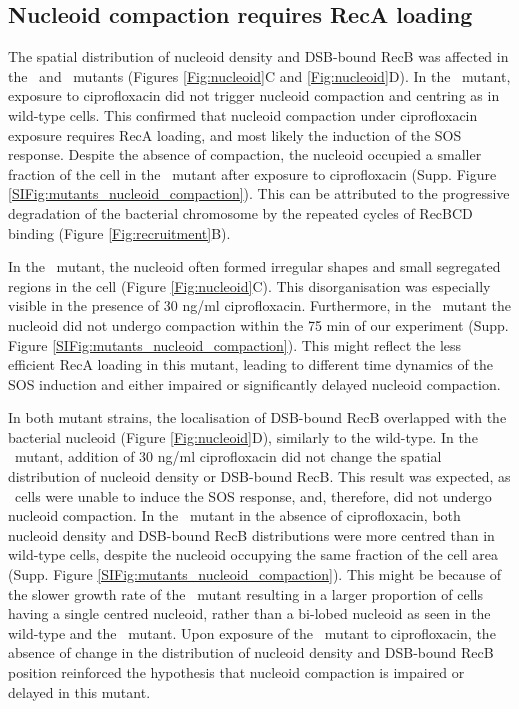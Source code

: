 \subsection*{Nucleoid compaction requires RecA loading}
The spatial distribution of nucleoid density and DSB-bound RecB was affected in the \dreca\ and \geneteneighty\ mutants (Figures \ref{Fig:nucleoid}C and \ref{Fig:nucleoid}D). In the \dreca\ mutant, exposure to ciprofloxacin did not trigger nucleoid compaction and centring as in wild-type cells. This confirmed that nucleoid compaction under ciprofloxacin exposure requires RecA loading, and most likely the induction of the SOS response. Despite the absence of compaction, the nucleoid occupied a smaller fraction of the cell in the \dreca\ mutant after exposure to ciprofloxacin (Supp. Figure \ref{SIFig:mutants_nucleoid_compaction}). This can be attributed to the progressive degradation of the bacterial chromosome by the repeated cycles of RecBCD binding (Figure \ref{Fig:recruitment}B).

In the \geneteneighty\ mutant, the nucleoid often formed irregular shapes and small segregated regions in the cell (Figure \ref{Fig:nucleoid}C). This disorganisation was especially visible in the presence of 30 ng/ml ciprofloxacin. Furthermore, in the \geneteneighty\ mutant the nucleoid did not undergo compaction within the 75 min of our experiment (Supp. Figure \ref{SIFig:mutants_nucleoid_compaction}). This might reflect the less efficient RecA loading in this mutant, leading to different time dynamics of the SOS induction and either impaired or significantly delayed nucleoid compaction.

In both mutant strains, the localisation of DSB-bound RecB overlapped with the bacterial nucleoid (Figure \ref{Fig:nucleoid}D), similarly to the wild-type. In the \dreca\ mutant, addition of 30 ng/ml ciprofloxacin did not change the spatial distribution of nucleoid density or DSB-bound RecB. This result was expected, as \dreca\ cells were unable to induce the SOS response, and, therefore, did not undergo nucleoid compaction. In the \geneteneighty\ mutant in the absence of ciprofloxacin, both nucleoid density and DSB-bound RecB distributions were more centred than in wild-type cells, despite the nucleoid occupying the same fraction of the cell area (Supp. Figure \ref{SIFig:mutants_nucleoid_compaction}). This might be because of the slower growth rate of the \teneighty\ mutant resulting in a larger proportion of cells having a single centred nucleoid, rather than a bi-lobed nucleoid as seen in the wild-type and the \dreca\ mutant. Upon exposure of the \geneteneighty\ mutant to ciprofloxacin, the absence of change in the distribution of nucleoid density and DSB-bound RecB position reinforced the hypothesis that nucleoid compaction is impaired or delayed in this mutant.

